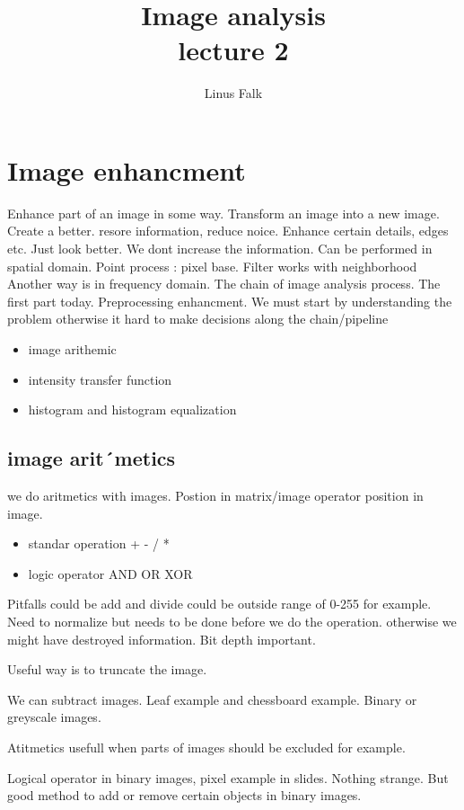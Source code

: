 \documentclass[a4paper]{article}
\title{Image analysis \\ lecture 2}
\author{Linus Falk}
\begin{document}
\maketitle
\section{Image enhancment}
Enhance part of an image in some way. Transform an image into a new image. Create a better. resore information, reduce noice.
Enhance certain details, edges etc. Just look better. 
We dont increase the information. Can be performed in spatial domain. Point process : pixel base. Filter works with neighborhood
Another way is in frequency domain. 
The chain of image analysis process. The first part today. Preprocessing enhancment. We must start by understanding the problem otherwise it hard to make decisions along the chain/pipeline


\begin{itemize}
    \item image arithemic
    \item intensity transfer function
    \item histogram and histogram equalization
\end{itemize}


\subsection{image arit´metics}
we do aritmetics with images. Postion in matrix/image operator position in image. 

\begin{itemize}
    \item standar operation + - / *
    \item logic operator AND OR XOR
\end{itemize}

Pitfalls could be add and divide could be outside range of 0-255 for example. Need to normalize but needs to be done before we do the operation. otherwise we might have destroyed information. Bit depth important. 

Useful way is to truncate the image. 

We can subtract images. Leaf example and chessboard example. Binary or greyscale images. 

Atitmetics usefull when parts of images should be excluded for example.

Logical operator in binary images, pixel example in slides. Nothing strange. But good method to add or remove certain objects in binary images. 
\end{document}

